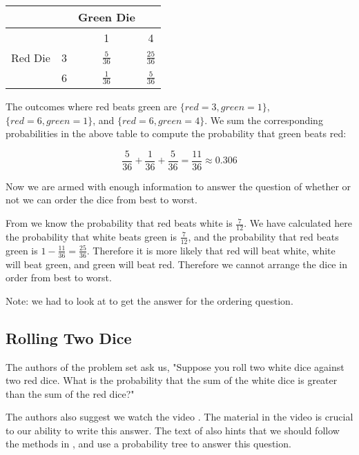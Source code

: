 \documentclass[a4paper,11pt]{article}
\begin{document}
\begin{center}
  \begin{tabular}{ | c | c | c | c| }
    \hline
     & & Green Die & \\ \hline
    & & 1 & 4 \\ \hline
    Red Die & 3 & $\frac{5}{36}$ & $\frac{25}{36}$\\ \hline
     & 6 & $\frac{1}{36}$ & $\frac{5}{36}$ \\ \hline
  \end{tabular}
\end{center}

The outcomes where red beats green are $\{red=3,green=1\}$, 
$\{red=6, green=1\}$, and $\{red=6, green=4\}$.  We sum 
the corresponding probabilities in the above table to compute
the probability that green beats red:

\begin{equation}
\frac{5}{36} + \frac{1}{36} + \frac{5}{36} = \frac{11}{36}
\approx 0.306
\end{equation}

Now we are armed with enough information to answer the question 
of whether or not we can order the dice from best to worst.

From \cite{classSlides2} we know the probability that red beats
white is $\frac{7}{12}$.  We have calculated here the probability that
white beats green is $\frac{7}{12}$, and the probability that red
beats green is $1-\frac{11}{36}=\frac{25}{36}$.  Therefore it is more
likely that red will beat white, white will beat green, and green will
beat red.  Therefore we cannot arrange the dice in order from best to
worst.

Note: we had to look at \cite{probSet1Solutions} to get the answer for
the ordering question.

\subsection{Rolling Two Dice}

The authors of the problem set \cite{probSet1} ask us, "Suppose you roll
two white dice against two red dice. What is the probability that the
sum of the white dice is greater than the sum of the red dice?"

The authors also suggest we watch the video \cite{youTubeDice}. The 
material in the video is crucial to our ability to write this
answer.  The text of \cite{probSet1} also hints that we should
follow the methods in \cite{probSet1}, and use a probability tree
to answer this question.
\end{document}
